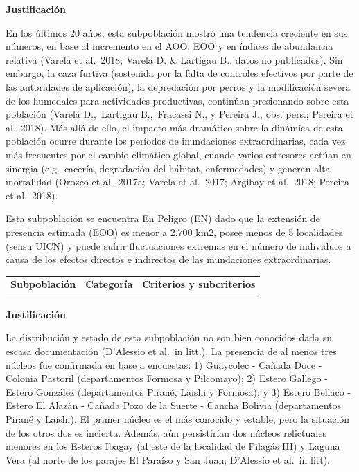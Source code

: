 \documentclass[
  x11names]{article}
\begin{document}
\textbf{Justificación}

En los últimos 20 años, esta subpoblación mostró una tendencia creciente
en sus números, en base al incremento en el AOO, EOO y en índices de
abundancia relativa (Varela et al.~2018; Varela D. \& Lartigau B., datos
no publicados). Sin embargo, la caza furtiva (sostenida por la falta de
controles efectivos por parte de las autoridades de aplicación), la
depredación por perros y la modificación severa de los humedales para
actividades productivas, continúan presionando sobre esta población
(Varela D.,~Lartigau B.,~Fracassi N., y Pereira J., obs. pers.; Pereira
et al.~2018). Más allá de ello, el impacto más dramático sobre la
dinámica de esta población ocurre durante los períodos de inundaciones
extraordinarias, cada vez más frecuentes por el cambio climático global,
cuando varios estresores actúan en sinergia (e.g.~cacería, degradación
del hábitat, enfermedades) y generan alta mortalidad (Orozco et
al.~2017a; Varela et al.~2017; Argibay et al.~2018; Pereira et
al.~2018).

Esta subpoblación se encuentra En Peligro (EN) dado que la extensión de
presencia estimada (EOO) es menor a 2.700 km2, posee menos de 5
localidades (sensu UICN) y puede sufrir fluctuaciones extremas en el
número de individuos a causa de los efectos directos e indirectos de las
inundaciones extraordinarias.\vspace{0.5cm}

\begin{tabu} to 
\toprule
\textbf{Subpoblación} & \textbf{Categoría} & \textbf{Criterios y subcriterios}\\
\midrule
{} &  & \\
\bottomrule
\end{tabu}

\textbf{Justificación}

La distribución y estado de esta subpoblación no son bien conocidos dada
su escasa documentación (D'Alessio et al.~in litt.). La presencia de al
menos tres núcleos fue confirmada en base a encuestas: 1) Guaycolec -
Cañada Doce - Colonia Pastoril (departamentos Formosa y Pilcomayo); 2)
Estero Gallego - Estero González (departamentos Pirané, Laishi y
Formosa); y 3) Estero Bellaco - Estero El Alazán - Cañada Pozo de la
Suerte - Cancha Bolivia (departamentos Pirané y Laishi). El primer
núcleo es el más conocido y estable, pero la situación de los otros dos
es incierta. Además, aún persistirían dos núcleos relictuales menores en
los Esteros Ibagay (al este de la localidad de Pilagás III) y Laguna
Vera (al norte de los parajes El Paraíso y San Juan; D'Alessio et al.~in
litt).
\end{document}
